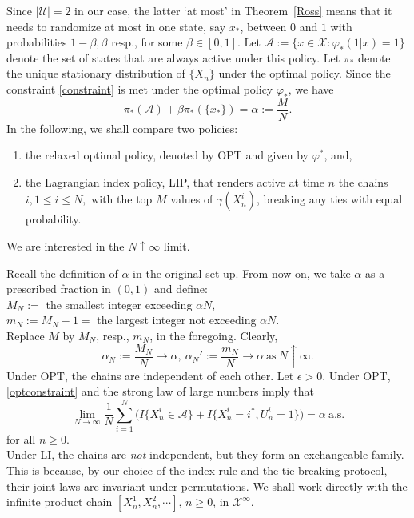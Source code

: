 \documentclass[12pt]{article}
\numberwithin{equation}{section}
\newcommand{\A}{\mathcal{A}}
\newcommand{\1}{\textbf{1}}
\newcommand{\U}{\mathcal{U}}
\newcommand{\X}{\mathcal{X}}
\begin{document}
Since $|\U| = 2$ in our case, the latter `at most' in Theorem~\ref{Ross} means that it needs to randomize at most in one state, say $x_*$,  between $0$ and $1$ with probabilities $1-\beta,\beta$ resp., for some $\beta\in [0,1]$. Let $\A:=\{x \in \X : \varphi_*(1|x)=1\}$ denote the set of states that are always active under this policy. Let $\pi_*$ denote the unique stationary distribution of $\{X_n\}$ under the optimal policy. Since the constraint \eqref{constraint} is met under the optimal policy $\varphi_*$, we have
\begin{equation}
\pi_*(\A) + \beta\pi_*(\{x_*\}) = \alpha := \frac{M}{N}. \label{optconstraint}
\end{equation}
In the following, we shall compare two policies:
\begin{enumerate}
\item the relaxed optimal policy, denoted by OPT and given by $\varphi^*$, and,
\item the Lagrangian index policy, LIP, that renders active at time $n$ the chains $i, 1 \leq i \leq N,$ with the top $M$ values of $\gamma(X^i_n)$, breaking any ties with equal probability.
\end{enumerate}
We are interested in the $N\uparrow\infty$ limit.  

Recall the definition of $\alpha$ in the original set up. From now on, we take $\alpha$ as a prescribed  fraction in $(0,1)$ and define:\\

\noindent  $M_N :=$ the smallest integer exceeding $\alpha N$, \\

\noindent $m_N := M_N-1 =$ the largest integer not exceeding $\alpha N$. \\

Replace $M$ by $M_N$, resp., $m_N$,  in the foregoing. Clearly,
$$\alpha_N := \frac{M_N}{N} \to \alpha, \ \alpha_N' := \frac{m_N}{N} \to \alpha \ \mbox{as} \ N\uparrow\infty.$$
Under OPT, the chains are independent of each other. Let $\epsilon > 0$. Under OPT, \eqref{optconstraint} and the strong law of large numbers imply that
$$\lim_{N\to\infty}\frac{1}{N}\sum_{i=1}^N\Big(I\{X^i_n\in \A\} + I\{X^i_n=i^*, U^i_n=1\}\Big) = \alpha \ \mbox{a.s.} $$
for all $n \geq 0$. \\

Under LI, the chains are \textit{not} independent, but they form an exchangeable family. This is because, by our choice of the index rule and the tie-breaking protocol, their joint laws are invariant under permutations. We shall work directly with the infinite product chain $[X^1_n, X^2_n, \cdots]$, $n \geq 0$, in $\X^\infty$.\\
\end{document}
